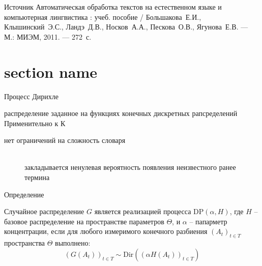\documentclass{beamer}
\newcommand{\brac}[1]{\left ( #1 \right )}
\begin{document}
\begin{frame}
  \begin{block}{Источник}
    Автоматическая обработка текстов на естественном языке и компьютерная лингвистика : учеб. пособие / Большакова~Е.И., Клышинский~Э.С., Ландэ~Д.В., Носков~А.А., Пескова~О.В., Ягунова~Е.В. — М.: МИЭМ, 2011. — 272~с. 
  \end{block}
\end{frame}


\section{section name} %
\label{sec:section_name}

\begin{frame}{Процесс Дирихле}
  \begin{block}

    распределение заданное на функциях конечных дискретных рапсределений
    Применительно к К \begin{description}
      \item[нет ограничений на сложность словаря]\hfill\\
        закладывается ненулевая вероятность появления неизвестного ранее термина 
    \end{description}
  \end{block}
\end{frame}

\begin{frame}{Определение}
  \begin{block}

    Случайное распределение $G$ является реализацией процесса $\text{DP}\brac{\alpha,H}$, где $H$ -- базовое распределение на пространстве параметров $\Theta$, и $\alpha$ -- папарметр концентрации, если для любого измеримого конечного разбиения $\brac{A_t}_{t\in T}$ пространства $\Theta$ выполнено:
    \[\brac{G(A_t)}_{t\in T}\sim \text{Dir}\brac{ \brac{\alpha H(A_t)}_{t\in T} }\] 
  \end{block}
\end{frame}
\end{document}
